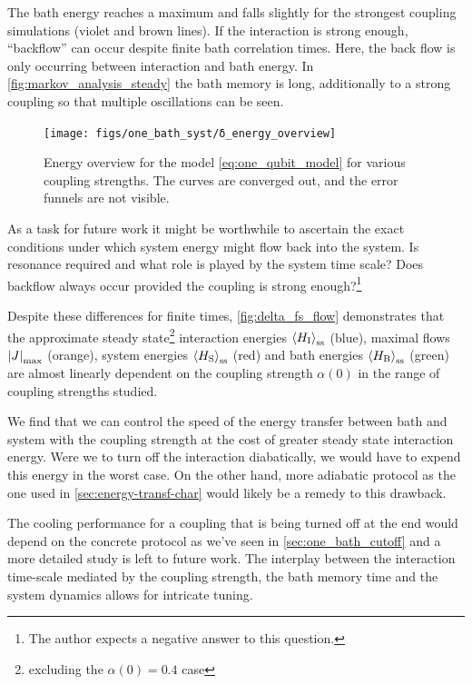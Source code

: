 The bath energy reaches a maximum and falls slightly for the strongest
coupling simulations (violet and brown lines). If the interaction is
strong enough, ``backflow'' can occur despite finite bath correlation
times. Here, the back flow is only occurring between interaction and
bath energy. In \cref{fig:markov_analysis_steady} the bath memory is
long, additionally to a strong coupling so that multiple oscillations
can be seen.
\begin{figure}[htp]
  \centering
  \texttt{[image: figs/one\_bath\_syst/δ\_energy\_overview]}
  \caption{\label{fig:delta_energy_overview} Energy overview for the
    model \cref{eq:one_qubit_model} for various coupling
    strengths. The curves are converged out, and the error funnels are
    not visible.}
\end{figure}

As a task for future work it might be worthwhile to ascertain the
exact conditions under which system energy might flow back into the
system. Is resonance required and what role is played by the system
time scale? Does backflow always occur provided the coupling is strong
enough?\footnote{The author expects a negative answer to this
  question.}

Despite these differences for finite times, \cref{fig:delta_fs_flow}
demonstrates that the approximate steady state\footnote{excluding the
  \(α(0)=0.4\) case} interaction energies
\(\ev{H_{\inter}}_{\mathrm{ss}}\) (blue), maximal flows
\(\abs{J}_{\mathrm{max}}\) (orange), system energies
\(\ev{H_{\sys}}_{\mathrm{ss}}\) (red) and bath energies
\(\ev{H_{\bath}}_{\mathrm{ss}}\) (green) are almost linearly dependent
on the coupling strength \(α(0)\) in the range of coupling strengths
studied.

We find that we can control the speed of the energy transfer between
bath and system with the coupling strength at the cost of greater
steady state interaction energy. Were we to turn off the interaction
diabatically, we would have to expend this energy in the worst
case. On the other hand, more adiabatic protocol as the one used in
\cref{sec:energy-transf-char} would likely be a remedy to this
drawback.

The cooling performance for a coupling that is being turned off at the
end would depend on the concrete protocol as we've seen in
\cref{sec:one_bath_cutoff} and a more detailed study is left to future
work. The interplay between the interaction time-scale mediated by the
coupling strength, the bath memory time and the system dynamics allows
for intricate tuning.

